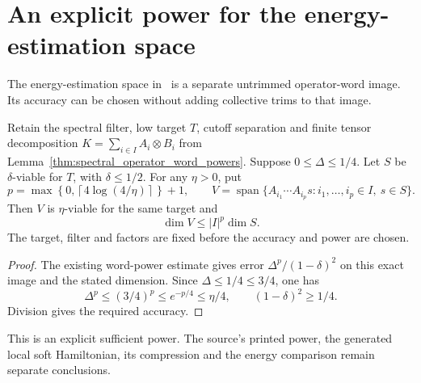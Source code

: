 \section{An explicit power for the energy-estimation space}

The energy-estimation space in~\cite[Figure \texttt{fig:algo1}, line 1631]
{Arad2016RigorousRG} is a separate untrimmed operator-word image. Its
accuracy can be chosen without adding collective trims to that image.

\begin{lemma}
    \label{lem:untrimmed_tensor_family_ceil_log}
    \leanok
    Retain the spectral filter, low target $T$, cutoff separation and finite
    tensor decomposition $K=\sum_{i\in I} A_i\otimes B_i$ from
    Lemma~\ref{thm:spectral_operator_word_powers}. Suppose
    $0\le\Delta\le1/4$. Let $S$ be $\delta$-viable for $T$, with
    $\delta\le1/2$. For any $\eta>0$, put
    \[
        p=\max\left\{0,\left\lceil4\log(4/\eta)\right\rceil\right\}+1,\qquad
        V=\operatorname{span}\{A_{i_1}\cdots A_{i_p}s:
        i_1,\ldots,i_p\in I,\ s\in S\}.
    \]
    Then $V$ is $\eta$-viable for the same target and
    \[
        \dim V\le |I|^p\dim S.
    \]
    The target, filter and factors are fixed before the accuracy and
    power are chosen.
\end{lemma}
\begin{proof}\leanok
    The existing word-power estimate gives error
    $\Delta^p/(1-\delta)^2$ on this exact image and the stated dimension.
    Since $\Delta\le1/4\le3/4$, one has
    \[
        \Delta^p\le(3/4)^p\le e^{-p/4}\le\eta/4,
        \qquad (1-\delta)^2\ge1/4.
    \]
    Division gives the required accuracy.
\end{proof}

This is an explicit sufficient power. The source's printed power,
the generated local soft Hamiltonian, its compression and the energy
comparison remain separate conclusions.
